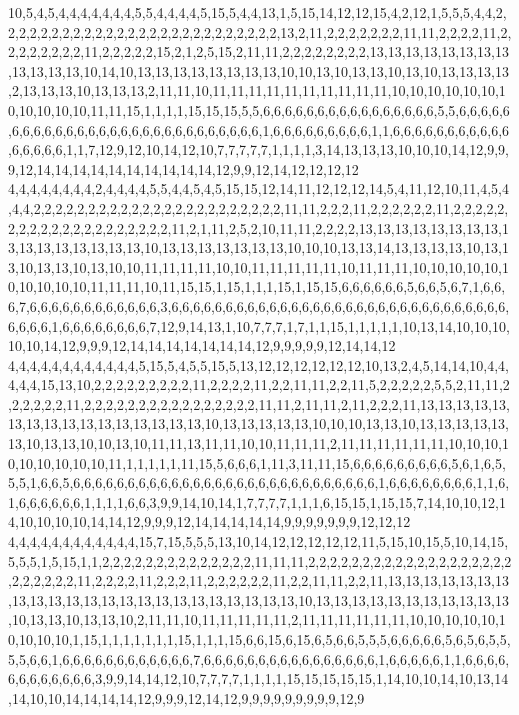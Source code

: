10,5,4,5,4,4,4,4,4,4,4,5,5,4,4,4,4,5,15,5,4,4,13,1,5,15,14,12,12,15,4,2,12,1,5,5,5,4,4,2,2,2,2,2,2,2,2,2,2,2,2,2,2,2,2,2,2,2,2,2,2,2,2,2,2,13,2,11,2,2,2,2,2,2,2,11,11,2,2,2,2,11,2,2,2,2,2,2,2,2,11,2,2,2,2,2,15,2,1,2,5,15,2,11,11,2,2,2,2,2,2,2,2,13,13,13,13,13,13,13,13,13,13,13,13,10,14,10,13,13,13,13,13,13,13,13,10,10,13,10,13,13,10,13,10,13,13,13,13,2,13,13,13,10,13,13,13,2,11,11,10,11,11,11,11,11,11,11,11,11,11,10,10,10,10,10,10,10,10,10,10,10,11,11,15,1,1,1,1,15,15,15,5,5,6,6,6,6,6,6,6,6,6,6,6,6,6,6,6,6,5,5,6,6,6,6,6,6,6,6,6,6,6,6,6,6,6,6,6,6,6,6,6,6,6,6,6,6,6,6,1,6,6,6,6,6,6,6,6,6,1,1,6,6,6,6,6,6,6,6,6,6,6,6,6,6,6,6,1,1,7,12,9,12,10,14,12,10,7,7,7,7,7,1,1,1,1,3,14,13,13,13,10,10,10,14,12,9,9,9,12,14,14,14,14,14,14,14,14,14,14,12,9,9,12,14,12,12,12,12
4,4,4,4,4,4,4,4,2,4,4,4,4,5,5,4,4,5,4,5,15,15,12,14,11,12,12,12,14,5,4,11,12,10,11,4,5,4,4,4,2,2,2,2,2,2,2,2,2,2,2,2,2,2,2,2,2,2,2,2,2,2,2,11,11,2,2,2,11,2,2,2,2,2,2,11,2,2,2,2,2,2,2,2,2,2,2,2,2,2,2,2,2,2,2,2,11,2,1,11,2,5,2,10,11,11,2,2,2,2,13,13,13,13,13,13,13,13,13,13,13,13,13,13,13,13,10,13,13,13,13,13,13,13,10,10,10,13,13,14,13,13,13,13,10,13,13,10,13,13,10,13,10,10,11,11,11,11,10,10,11,11,11,11,11,10,11,11,11,10,10,10,10,10,10,10,10,10,10,11,11,11,10,11,15,15,1,15,1,1,1,15,1,15,15,6,6,6,6,6,6,5,6,6,5,6,7,1,6,6,6,7,6,6,6,6,6,6,6,6,6,6,6,6,3,6,6,6,6,6,6,6,6,6,6,6,6,6,6,6,6,6,6,6,6,6,6,6,6,6,6,6,6,6,6,6,6,6,6,6,1,6,6,6,6,6,6,6,6,7,12,9,14,13,1,10,7,7,7,1,7,1,1,15,1,1,1,1,1,10,13,14,10,10,10,10,10,14,12,9,9,9,12,14,14,14,14,14,14,14,12,9,9,9,9,9,12,14,14,12
4,4,4,4,4,4,4,4,4,4,4,4,5,15,5,4,5,5,15,5,13,12,12,12,12,12,12,10,13,2,4,5,14,14,10,4,4,4,4,4,15,13,10,2,2,2,2,2,2,2,2,2,11,2,2,2,2,11,2,2,11,11,2,2,11,5,2,2,2,2,2,5,5,2,11,11,2,2,2,2,2,2,11,2,2,2,2,2,2,2,2,2,2,2,2,2,2,2,2,11,11,2,11,11,2,11,2,2,2,11,13,13,13,13,13,13,13,13,13,13,13,13,13,13,13,13,10,13,13,13,13,13,10,10,10,13,13,10,13,13,13,13,13,13,10,13,13,10,10,13,10,11,11,13,11,11,10,10,11,11,11,2,11,11,11,11,11,11,10,10,10,10,10,10,10,10,10,11,1,1,1,1,1,11,15,5,6,6,6,1,11,3,11,11,15,6,6,6,6,6,6,6,6,6,5,6,1,6,5,5,5,1,6,6,5,6,6,6,6,6,6,6,6,6,6,6,6,6,6,6,6,6,6,6,6,6,6,6,6,6,6,6,6,1,6,6,6,6,6,6,6,6,1,1,6,1,6,6,6,6,6,6,1,1,1,1,6,6,3,9,9,14,10,14,1,7,7,7,7,1,1,1,6,15,15,1,15,15,7,14,10,10,12,14,10,10,10,10,14,14,12,9,9,9,12,14,14,14,14,14,9,9,9,9,9,9,9,12,12,12
4,4,4,4,4,4,4,4,4,4,4,4,15,7,15,5,5,5,13,10,14,12,12,12,12,12,11,5,15,10,15,5,10,14,15,5,5,5,1,5,15,1,1,2,2,2,2,2,2,2,2,2,2,2,2,2,2,11,11,11,2,2,2,2,2,2,2,2,2,2,2,2,2,2,2,2,2,2,2,2,2,2,2,2,2,11,2,2,2,2,11,2,2,2,11,2,2,2,2,2,2,11,2,2,11,11,2,2,11,13,13,13,13,13,13,13,13,13,13,13,13,13,13,13,13,13,13,13,13,13,13,13,10,13,13,13,13,13,13,13,13,13,13,13,10,13,13,10,13,13,10,2,11,11,10,11,11,11,11,11,2,11,11,11,11,11,11,10,10,10,10,10,10,10,10,10,1,15,1,1,1,1,1,1,1,15,1,1,1,15,6,6,15,6,15,6,5,6,6,5,5,5,6,6,6,6,6,5,6,5,6,5,5,5,5,6,6,1,6,6,6,6,6,6,6,6,6,6,6,6,7,6,6,6,6,6,6,6,6,6,6,6,6,6,6,6,6,1,6,6,6,6,6,1,1,6,6,6,6,6,6,6,6,6,6,6,6,3,9,9,14,14,12,10,7,7,7,7,1,1,1,1,15,15,15,15,15,1,14,10,10,14,10,13,14,14,10,10,14,14,14,14,12,9,9,9,12,14,12,9,9,9,9,9,9,9,9,9,12,9
